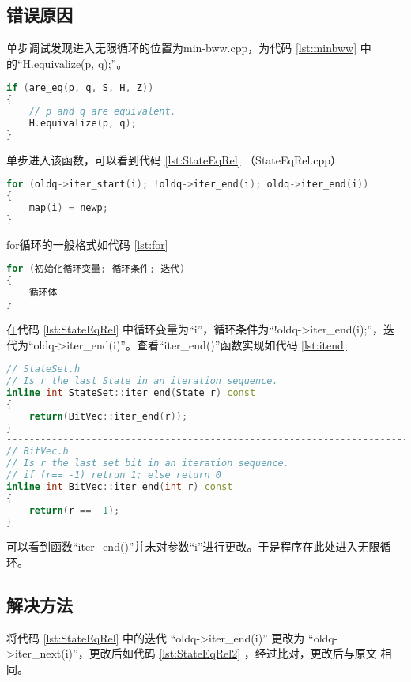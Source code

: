 \subsection{错误原因} 

单步调试发现进入无限循环的位置为min-bww.cpp，为代码 \ref{lst:minbww} 中的“H.equivalize(p, q);”。

\begin{lstlisting}[language=C++,label={lst:minbww},caption={min-bww.cpp}]
if (are_eq(p, q, S, H, Z))
{
    // p and q are equivalent.
    H.equivalize(p, q);
}
\end{lstlisting}
单步进入该函数，可以看到代码 \ref{lst:StateEqRel} （StateEqRel.cpp）

\begin{lstlisting}[language=C++,label={lst:StateEqRel},caption={StateEqRel.cpp}]
for (oldq->iter_start(i); !oldq->iter_end(i); oldq->iter_end(i))
{
    map(i) = newp;
}
\end{lstlisting}

\newpage
for循环的一般格式如代码 \ref{lst:for}

\begin{lstlisting}[language=C++,label={lst:for},caption={for 循环的一般格式}]
for (初始化循环变量; 循环条件; 迭代)
{
    循环体
}
\end{lstlisting}
在代码 \ref{lst:StateEqRel} 中循环变量为“i”，循环条件为“!oldq->iter\_end(i);”，迭代为“oldq->iter\_end(i)”。查看“iter\_end()”函数实现如代码 \ref{lst:itend}

\begin{lstlisting}[language=C++,label={lst:itend},caption={函数 iter\_end() 的实现}]
// StateSet.h
// Is r the last State in an iteration sequence.
inline int StateSet::iter_end(State r) const
{
	return(BitVec::iter_end(r));
}
---------------------------------------------------------------------------
// BitVec.h
// Is r the last set bit in an iteration sequence.
// if (r== -1) retrun 1; else return 0
inline int BitVec::iter_end(int r) const
{
	return(r == -1);
}
\end{lstlisting}
可以看到函数“iter\_end()”并未对参数“i”进行更改。于是程序在此处进入无限循环。

\subsection{解决方法}

将代码 \ref{lst:StateEqRel} 中的迭代 “oldq->iter\_end(i)” 更改为 “oldq->iter\_next(i)”，更改后如代码 \ref{lst:StateEqRel2} ，经过比对，更改后与原文 \cite{watson1994design} 相同。

